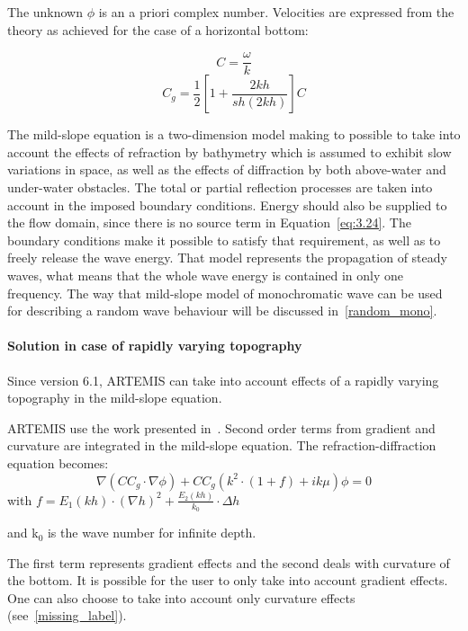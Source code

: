 The unknown $\phi$ is an a priori complex number. Velocities are expressed from
the theory as achieved for the case of a horizontal bottom:

\begin{equation}
  C = \frac{\omega}{k}
  \label{eq:3.25}
\end{equation}
\begin{equation}
  C_{g} = \frac{1}{2}\left[1+\frac{2kh}{sh(2kh)}\right]C
  \label{eq:3.26}
\end{equation}

The mild-slope equation is a two-dimension model making to possible to take
into account the effects of refraction by bathymetry which is assumed to
exhibit slow variations in space, as well as the effects of diffraction by both
above-water and under-water obstacles. The total or partial reflection
processes are taken into account in the imposed boundary conditions. Energy
should also be supplied to the flow domain, since there is no source term in
Equation~\eqref{eq:3.24}. The boundary conditions make it possible to
satisfy that requirement, as well as to freely release the wave energy. That
model represents the propagation of steady waves, what means that the whole
wave energy is contained in only one frequency. The way that mild-slope model
of monochromatic wave can be used for describing a random wave behaviour will
be discussed in~\ref{random_mono}.


\paragraph{Solution in case of rapidly varying topography}

Since version 6.1, ARTEMIS can take into account effects of a rapidly varying
topography in the mild-slope equation.

ARTEMIS use the work presented in~\cite{Michel1999}. Second order terms from
gradient and curvature are integrated in the mild-slope equation. The
refraction-diffraction equation becomes:
\[\nabla \left(CC_{g} \cdot \nabla \phi \right)+CC_{g} \left(k^{2} \cdot \left(1+f\right)+ik\mu \right)\phi =0\]
with $f=E_{1} (kh)\cdot \left(\nabla h\right)^{2} +\frac{E_{2} (kh)}{k_{0} } \cdot \Delta h$

and k${}_{0}$ is the wave number for infinite depth.

The first term represents gradient effects and the second deals with curvature
of the bottom. It is possible for the user to only take into account gradient
effects. One can also choose to take into account only curvature effects
(see~\ref{missing_label}).


